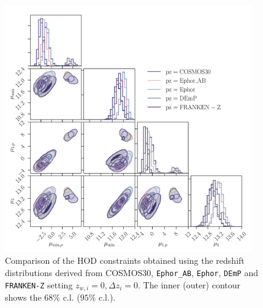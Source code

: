 \documentclass[a4paper,11pt]{article}
\begin{document}
\begin{figure}
  \begin{center}
    \includegraphics[width=0.95\textwidth]{figures/contours-Mmin-M1_mPk=HOD_fix=alpha-fc-sigmaM_HOD=zevol_no-pz-shifts_fit=auto+cross_cosmo=const_HOD-param=zfid_clfit=HOD-zevol_pz-methods.pdf}
    \caption{Comparison of the HOD constraints obtained using the redshift distributions derived from COSMOS30, \texttt{Ephor\_AB}, \texttt{Ephor}, \texttt{DEmP} and \texttt{FRANKEN-Z} setting $z_{w, i} = 0, \Delta z_{i} = 0$. The inner (outer) contour shows the $68 \%$ c.l. ($95 \%$ c.l.).}
    \label{fig:constraints-HOD-no-pz-shifts-pz-methods}
  \end{center}
\end{figure}  


\end{document}
